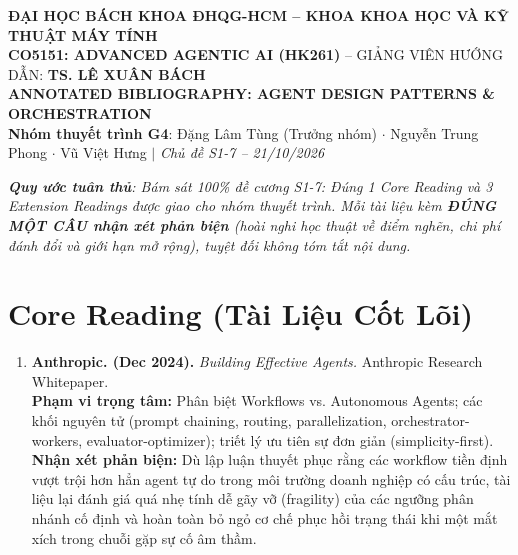 \documentclass[10pt,a4paper]{article}
\begin{document}

\begin{center}
  {\footnotesize \textbf{ĐẠI HỌC BÁCH KHOA ĐHQG-HCM -- KHOA KHOA HỌC VÀ KỸ THUẬT MÁY TÍNH}}\\[0.04cm]
  {\small \textbf{CO5151: ADVANCED AGENTIC AI (HK261)} -- GIẢNG VIÊN HƯỚNG DẪN: \textbf{TS. LÊ XUÂN BÁCH}}\\[0.12cm]
  {\large\bfseries\color{hcmutblue} ANNOTATED BIBLIOGRAPHY: AGENT DESIGN PATTERNS \& ORCHESTRATION}\\[0.04cm]
  {\footnotesize \textbf{Nhóm thuyết trình G4}: Đặng Lâm Tùng (Trưởng nhóm) $\cdot$ Nguyễn Trung Phong $\cdot$ Vũ Việt Hưng $\vert$ \textit{Chủ đề S1-7 -- 21/10/2026}}
\end{center}

\vspace{-0.15cm}
\noindent\textit{\footnotesize \textbf{Quy ước tuân thủ}: Bám sát 100\% đề cương S1-7: Đúng 1 Core Reading và 3 Extension Readings được giao cho nhóm thuyết trình. Mỗi tài liệu kèm \textbf{ĐÚNG MỘT CÂU nhận xét phản biện} (hoài nghi học thuật về điểm nghẽn, chi phí đánh đổi và giới hạn mở rộng), tuyệt đối không tóm tắt nội dung.}

\section{Core Reading (Tài Liệu Cốt Lõi)}
\begin{enumerate}[leftmargin=1.4em, itemsep=6pt, topsep=3pt]
  \item \textbf{Anthropic. (Dec 2024).} \textit{Building Effective Agents.} Anthropic Research Whitepaper.\\
  \textbf{Phạm vi trọng tâm:} Phân biệt Workflows vs. Autonomous Agents; các khối nguyên tử (prompt chaining, routing, parallelization, orchestrator-workers, evaluator-optimizer); triết lý ưu tiên sự đơn giản (simplicity-first).\\
  \textcolor{critiquecolor}{\textbf{Nhận xét phản biện:}} Dù lập luận thuyết phục rằng các workflow tiền định vượt trội hơn hẳn agent tự do trong môi trường doanh nghiệp có cấu trúc, tài liệu lại đánh giá quá nhẹ tính dễ gãy vỡ (fragility) của các ngưỡng phân nhánh cố định và hoàn toàn bỏ ngỏ cơ chế phục hồi trạng thái khi một mắt xích trong chuỗi gặp sự cố âm thầm.
\end{enumerate}
\end{document}
